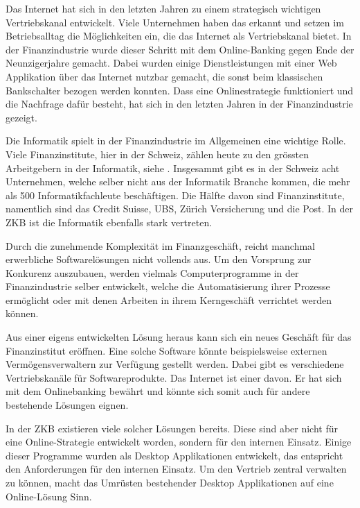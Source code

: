   Das Internet hat sich in den letzten Jahren zu einem strategisch wichtigen
  Vertriebskanal entwickelt. Viele Unternehmen haben das erkannt und setzen im
  Betriebsalltag die Möglichkeiten ein, die das Internet als Vertriebskanal
  bietet. In der Finanzindustrie wurde dieser Schritt mit dem Online-Banking
  gegen Ende der Neunzigerjahre gemacht. Dabei wurden einige Dienstleistungen
  mit einer Web Applikation über das Internet nutzbar gemacht, die sonst beim
  klassischen Bankschalter bezogen werden konnten. Dass eine Onlinestrategie
  funktioniert und die Nachfrage dafür besteht, hat sich in den letzten Jahren
  in der Finanzindustrie gezeigt.
  
  Die Informatik spielt in der Finanzindustrie im Allgemeinen eine wichtige
  Rolle. Viele Finanzinstitute, hier in der Schweiz, zählen heute zu den
  grössten Arbeitgebern in der Informatik, siehe
  \cite{WoArbeitenInformatikfachleute}. Insgesammt gibt es in der Schweiz acht
  Unternehmen, welche selber nicht aus der Informatik Branche kommen, die mehr
  als 500 Informatikfachleute beschäftigen. Die Hälfte davon sind
  Finanzinstitute, namentlich sind das Credit Suisse, UBS, Zürich Versicherung
  und die Post. In der \ac{ZKB} ist die Informatik ebenfalls stark vertreten.
  
  Durch die zunehmende Komplexität im Finanzgeschäft, reicht manchmal 
  erwerbliche Softwarelösungen nicht vollends aus. Um den Vorsprung zur
  Konkurenz auszubauen, werden vielmals Computerprogramme in der
  Finanzindustrie selber entwickelt, welche die Automatisierung ihrer Prozesse
  ermöglicht oder mit denen Arbeiten in ihrem Kerngeschäft verrichtet werden
  können.
  
  Aus einer eigens entwickelten Lösung heraus kann sich ein neues Geschäft für
  das Finanzinstitut eröffnen. Eine solche Software könnte beispielsweise
  externen Vermögensverwaltern zur Verfügung gestellt werden. Dabei gibt es
  verschiedene Vertriebskanäle für Softwareprodukte. Das Internet ist einer
  davon. Er hat sich mit dem Onlinebanking bewährt und könnte sich somit auch
  für andere bestehende Lösungen eignen.
  
  In der \ac{ZKB} existieren viele solcher Lösungen bereits. Diese sind
  aber nicht für eine Online-Strategie entwickelt worden, sondern für den
  internen Einsatz. Einige dieser Programme wurden als Desktop Applikationen
  entwickelt, das entspricht den Anforderungen für den internen Einsatz. Um den
  Vertrieb zentral verwalten zu können, macht das Umrüsten bestehender Desktop
  Applikationen auf eine Online-Lösung Sinn.
  
